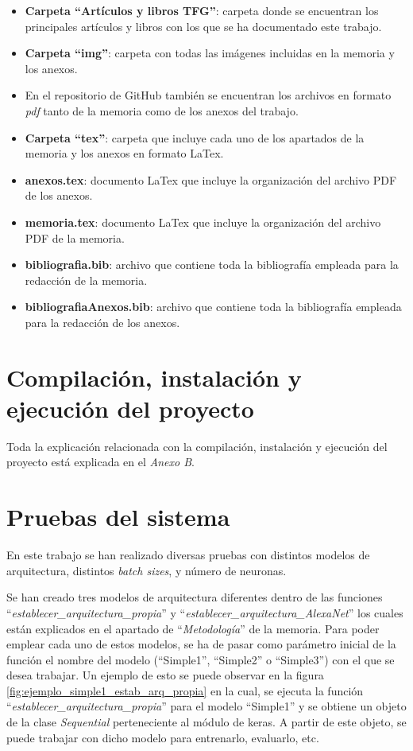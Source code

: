 \begin{itemize}
\begin{itemize}
    \end{itemize}
    \item \textbf{Carpeta ``Artículos y libros TFG''}: carpeta donde se encuentran los principales artículos y libros con los que se ha documentado este trabajo. 
    \item \textbf{Carpeta ``img''}: carpeta con todas las imágenes incluidas en la memoria y los anexos.
    \item En el repositorio de GitHub también se encuentran los archivos en formato \textit{pdf} tanto de la memoria como de los anexos del trabajo.
    \item \textbf{Carpeta ``tex''}: carpeta que incluye cada uno de los apartados de la memoria y los anexos en formato LaTex.
    \item \textbf{anexos.tex}: documento LaTex que incluye la organización del archivo PDF de los anexos.
    \item \textbf{memoria.tex}: documento LaTex que incluye la organización del archivo PDF de la memoria.
    \item \textbf{bibliografia.bib}: archivo que contiene toda la bibliografía empleada para la redacción de la memoria.
    \item \textbf{bibliografiaAnexos.bib}: archivo que contiene toda la bibliografía empleada para la redacción de los anexos.
    
\end{itemize}


\section{Compilación, instalación y ejecución del proyecto}

Toda la explicación relacionada con la compilación, instalación y ejecución del proyecto está explicada en el \textit{Anexo B}.


\section{Pruebas del sistema}

En este trabajo se han realizado diversas pruebas con distintos modelos de arquitectura, distintos \textit{batch sizes}, y número de neuronas. 

Se han creado tres modelos de arquitectura diferentes dentro de las funciones ``\textit{establecer\_arquitectura\_propia}'' y ``\textit{establecer\_arquitectura\_AlexaNet}'' los cuales están explicados en el apartado de ``\textit{Metodología}'' de la memoria. Para poder emplear cada uno de estos modelos, se ha de pasar como parámetro inicial de la función el nombre del modelo (``Simple1'', ``Simple2'' o ``Simple3'') con el que se desea trabajar. Un ejemplo de esto se puede observar en la figura \ref{fig:ejemplo_simple1_estab_arq_propia} en la cual, se ejecuta la función ``\textit{establecer\_arquitectura\_propia}'' para el modelo ``Simple1'' y se obtiene un objeto de la clase \textit{Sequential} perteneciente al módulo de keras. A partir de este objeto, se puede trabajar con dicho modelo para entrenarlo, evaluarlo, etc.

